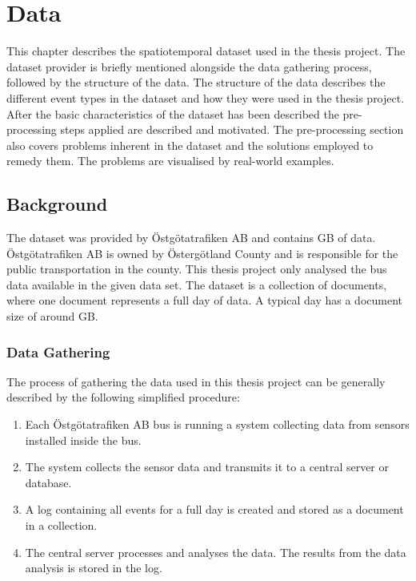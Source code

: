 \chapter{Data}
\label{cha:data}

This chapter describes the spatiotemporal dataset used in the thesis project.
The dataset provider is briefly mentioned alongside the data gathering process, followed by the structure of the data.
The structure of the data describes the different event types in the dataset and how they were used in the thesis project.
After the basic characteristics of the dataset has been described the pre-processing steps applied are described and motivated.
The pre-processing section also covers problems inherent in the dataset and the solutions employed to remedy them.
The problems are visualised by real-world examples.

\section{Background}
The dataset was provided by Östgötatrafiken AB and contains GB of data.
Östgötatrafiken AB is owned by Östergötland County and is responsible for the public transportation in the county.
This thesis project only analysed the bus data available in the given data set.
The dataset is a collection of documents, where one document represents a full day of data.
A typical day has a document size of around GB.

\subsection{Data Gathering}
The process of gathering the data used in this thesis project can be generally described by the following simplified procedure:
\begin{enumerate}
    \item Each Östgötatrafiken AB bus is running a system collecting data from sensors installed inside the bus.
    \item The system collects the sensor data and transmits it to a central server or database.
    \item A log containing all events for a full day is created and stored as a document in a collection.
    \item The central server processes and analyses the data. The results from the data analysis is stored in the log.
\end{enumerate}


